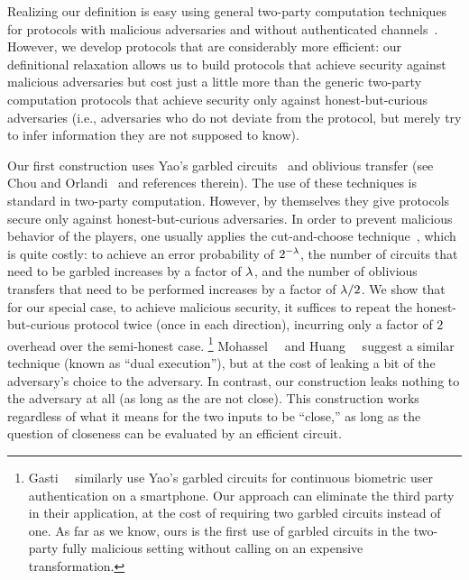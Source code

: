 Realizing our \FAKE definition %
is easy using general two-party computation techniques for protocols with malicious adversaries and without authenticated channels~\cite{C:BCLPR05}. 
However, we develop protocols that are considerably more efficient: our definitional relaxation allows us to build protocols that achieve security against malicious adversaries but cost just a little more than the generic two-party computation protocols that achieve security only against honest-but-curious adversaries (i.e., adversaries who do not deviate from the protocol, but merely try to infer information they are not supposed to know).

Our first construction uses Yao's garbled circuits~\cite{FOCS:Yao86,CCS:BelHoaRog12} and oblivious transfer (see Chou and Orlandi~\cite{LC:ChoOrl15} and references therein).
The use of these techniques is standard in two-party computation.
However, by themselves they give protocols secure only against honest-but-curious adversaries. 
In order to prevent malicious behavior of the players, one usually applies the cut-and-choose technique~\cite{TCC:LinPin11}, which is quite costly: to achieve an error probability of $2^{-\lambda}$, the number of circuits that need to be garbled increases by a factor of $\lambda$, and the number of oblivious transfers that need to be performed increases by a factor of $\lambda / 2$. 
We show that for our special case, to achieve malicious security, it suffices to repeat the honest-but-curious protocol twice (once in each direction), incurring only a factor of $2$ overhead over the semi-honest case. %
\footnote{
Gasti~\etal~\cite{Gasti2016} similarly use Yao's garbled circuits for continuous biometric user authentication on a smartphone.
Our approach can eliminate the third party in their application, at the cost of requiring two garbled circuits instead of one.
As far as we know, ours is the first use of garbled circuits in the two-party fully malicious setting without calling on an expensive transformation.
}
Mohassel~\etal~\cite{PKC:MohFra06b} and Huang~\etal~\cite{SP:HuaKatEva12} suggest a similar technique (known as ``dual execution''), but at the cost of leaking a bit of the adversary's choice to the adversary.
In contrast, our construction leaks nothing to the adversary at all (as long as the \passwords are not close).
This construction works regardless of what it means for the two inputs to be ``close,'' as long as the question of closeness can be evaluated by an efficient circuit.

